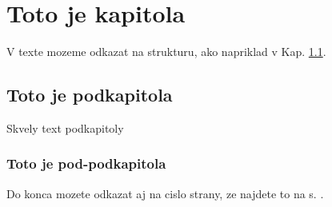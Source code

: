 \documentclass{book}
\begin{document}
\chapter{Toto je kapitola}
V texte mozeme odkazat na strukturu, ako napriklad v Kap. \ref{mojnazov}.

\section{Toto je podkapitola}
\label{mojnazov}
Skvely text podkapitoly

\subsection{Toto je pod-podkapitola}
Do konca mozete odkazat aj na cislo strany, ze najdete to na s. \pageref{mojnazov}.
\end{document}
